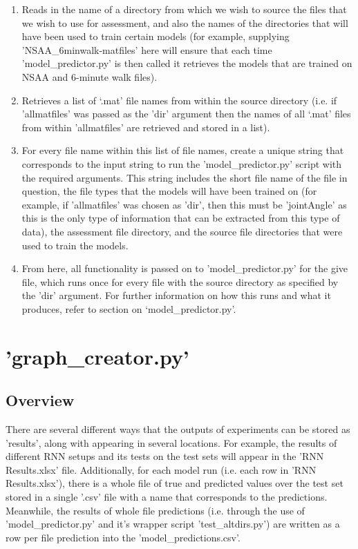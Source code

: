 \documentclass[12pt,twoside]{report}
\begin{document}
\begin{enumerate}
	\item Reads in the name of a directory from which we wish to source the files that we wish to use for assessment, and also the names of the directories that will have been used to train certain models (for example, supplying 'NSAA\_6minwalk-matfiles' here will ensure that each time 'model\_predictor.py' is then called it retrieves the models that are trained on NSAA and 6-minute walk files).
	\item Retrieves a list of ‘.mat’ file names from within the source directory (i.e. if 'allmatfiles' was passed as the 'dir' argument then the names of all ‘.mat’ files from within 'allmatfiles' are retrieved and stored in a list).
	\item For every file name within this list of file names, create a unique string that corresponds to the input string to run the 'model\_predictor.py' script with the required arguments. This string includes the short file name of the file in question, the file types that the models will have been trained on (for example, if 'allmatfiles' was chosen as 'dir', then this must be 'jointAngle' as this is the only type of information that can be extracted from this type of data), the assessment file directory, and the source file directories that were used to train the models.
	\item From here, all functionality is passed on to 'model\_predictor.py' for the give file, which runs once for every file with the source directory as specified by the 'dir' argument. For further information on how this runs and what it produces, refer to section on ‘model\_predictor.py’.
\end{enumerate}



\section{'graph\_creator.py'}

\subsection{Overview}

\quad There are several different ways that the outputs of experiments can be stored as 'results', along with appearing in several locations. For example, the results of different RNN setups and its tests on the test sets will appear in the 'RNN Results.xlsx' file. Additionally, for each model run (i.e. each row in 'RNN Results.xlsx'), there is a whole file of true and predicted values over the test set stored in a single '.csv' file with a name that corresponds to the predictions. Meanwhile, the results of whole file predictions (i.e. through the use of 'model\_predictor.py' and it's wrapper script 'test\_altdirs.py') are written as a row per file prediction into the 'model\_predictions.csv'.\\
\end{document}
